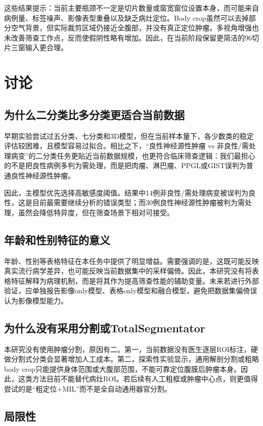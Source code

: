 \documentclass[UTF8,a4paper,11pt]{ctexart}
\begin{document}
这些结果提示：当前主要瓶颈不一定是切片数量或窗宽窗位设置本身，而可能来自病例量、标签噪声、影像表型重叠以及缺乏病灶定位。Body crop虽然可以去掉部分空气背景，但实际裁剪区域仍接近全腹部，并没有真正定位肿瘤。多视角增强也未改善筛查工作点，反而使假阴性略有增加。因此，在当前阶段保留更简洁的96切片三窗输入更合理。

\section{讨论}

\subsection{为什么二分类比多分类更适合当前数据}

早期实验尝试过五分类、七分类和3D模型，但在当前样本量下，各少数类的稳定评估较困难，且模型容易过拟合。相比之下，“良性神经源性肿瘤 vs 非良性/需处理病变”的二分类任务更贴近当前数据规模，也更符合临床筛查逻辑：我们最担心的不是把良性病例多判为需处理，而是把肉瘤、淋巴瘤、PPGL或GIST误判为普通良性神经源性肿瘤。

因此，主模型优先选择高敏感度阈值。结果中14例非良性/需处理病变被误判为良性，这是目前最需要继续分析的错误类型；而30例良性神经源性肿瘤被判为需处理，虽然会降低特异度，但在筛查场景下相对可接受。

\subsection{年龄和性别特征的意义}

年龄、性别等表格特征在本任务中提供了明显增益。需要强调的是，这既可能反映真实流行病学差异，也可能反映当前数据集中的采样偏倚。因此，本研究没有将表格特征解释为病理机制，而是将其作为提高筛查性能的辅助变量。未来若进行外部验证，应单独报告影像only模型、表格only模型和融合模型，避免把数据集偏倚误认为影像模型能力。

\subsection{为什么没有采用分割或TotalSegmentator}

本研究没有使用肿瘤分割，原因有二。第一，当前数据没有医生逐层ROI标注，硬做分割式分类会显著增加人工成本。第二，探索性实验显示，通用解剖分割或粗略body crop只能提供身体范围或大腹部范围，不能可靠定位腹膜后肿瘤本身。因此，这类方法目前不能替代病灶ROI。若后续有人工粗框或肿瘤中心点，则更值得尝试的是“粗定位+MIL”而不是全自动通用器官分割。

\subsection{局限性}
\end{document}
